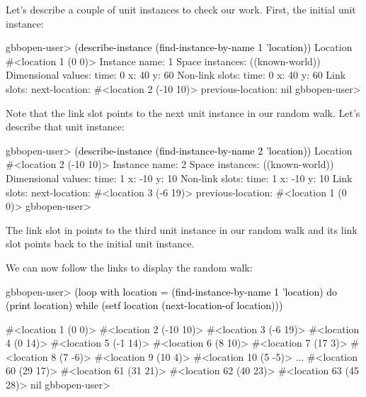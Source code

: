 \documentclass[10pt,twoside,english,pdftex]{article}
\begin{document}
Let's describe a couple of  unit instances to check our
work.  First, the initial  unit instance:
%
\W\supp
\begin{example}
\textcolor{darkergray}{%
  gbbopen-user> \textcolor{black}{(describe-instance (find-instance-by-name 1 'location))}
  Location #<location 1 (0 0)>
    Instance name: 1
    Space instances: ((known-world))
    Dimensional values:
      time:  0
      x:  40
      y:  60
    Non-link slots:
      time:  0
      x:  40
      y:  60
    Link slots:
      next-location:  #<location 2 (-10 10)>
      previous-location:  nil
  gbbopen-user>}
\end{example}
%
Note that the  link slot points to the next
 unit instance in our random walk.  Let's describe that
unit instance:
%
\W\supp\notpretop
\begin{example}
\textcolor{darkergray}{%
  gbbopen-user> \textcolor{black}{(describe-instance (find-instance-by-name 2 'location))}
  Location #<location 2 (-10 10)>
    Instance name: 2
    Space instances: ((known-world))
    Dimensional values:
      time:  1
      x:  -10
      y:  10
    Non-link slots:
      time:  1
      x:  -10
      y:  10
    Link slots:
      next-location:  #<location 3 (-6 19)>
      previous-location:  #<location 1 (0 0)>
  gbbopen-user>}
\end{example}
%
The  link slot in  
points to the third  unit instance in our random walk
and its  link slot points back to the initial
 unit instance.

We can now follow the links to display the random walk:
%
\W\supp
\begin{example}
\textcolor{darkergray}{%
  gbbopen-user> \textcolor{black}{(loop with location = (find-instance-by-name 1 'location) 
                  do (print location)
                  while (setf location (next-location-of location)))}

  #<location 1 (0 0)> 
  #<location 2 (-10 10)> 
  #<location 3 (-6 19)> 
  #<location 4 (0 14)> 
  #<location 5 (-1 14)> 
  #<location 6 (8 10)> 
  #<location 7 (17 3)> 
  #<location 8 (7 -6)> 
  #<location 9 (10 4)> 
  #<location 10 (5 -5)> 
       ...
  #<location 60 (29 17)> 
  #<location 61 (31 21)> 
  #<location 62 (40 23)> 
  #<location 63 (45 28)> 
  nil
  gbbopen-user>}
\end{example}
\end{document}
